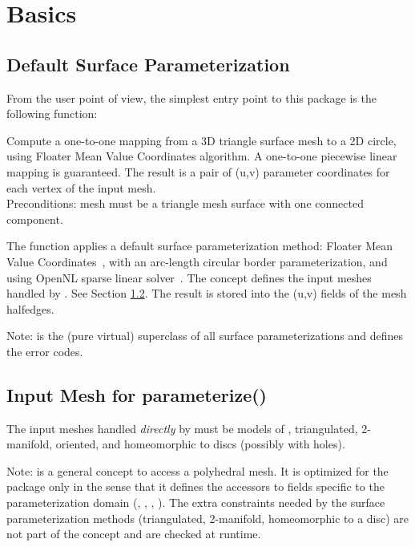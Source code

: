 \section{Basics}


\subsection{Default Surface Parameterization}

From the user point of view, the simplest entry point to this package
is the following function:

{
Compute a one-to-one mapping from a 3D triangle surface mesh to a 2D circle, using Floater Mean Value Coordinates algorithm. A one-to-one piecewise linear mapping is guaranteed. The result is a pair of (u,v) parameter coordinates for each vertex of the input mesh.\\
Preconditions: mesh must be a triangle mesh surface with one connected component.}

The function  applies a default surface parameterization
method: Floater Mean Value Coordinates~\cite{cgal:f-mvc-03}, with an
arc-length circular border parameterization, and using OpenNL sparse
linear solver~\cite{cgal:l-nmdgp-05}. The  concept defines the input meshes handled by . See Section \ref{sec:Input-Mesh-for-parameterize}. The result is stored into the (u,v) fields of the mesh halfedges.

Note:  is the (pure virtual) superclass of all surface parameterizations and defines the error codes.


\subsection{Input Mesh for parameterize()}
\label{sec:Input-Mesh-for-parameterize}

The input meshes handled \emph{directly} by  must be models of , triangulated, 2-manifold, oriented, and homeomorphic to discs (possibly with holes).

Note:  is a general concept to access a
polyhedral mesh. It is optimized for the  package
only in the sense that it
defines the accessors to fields specific to the parameterization domain
(, , , ).
The extra constraints  needed by the surface parameterization methods (triangulated,
2-manifold, homeomorphic to a disc) are not part of the concept and
are checked at runtime.


